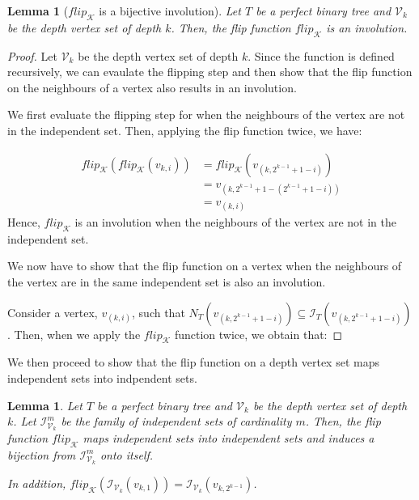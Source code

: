 \documentclass{amsart}
\newtheorem{lemma}[theorem]{Lemma}
\theoremstyle{definition}
\begin{document}
\begin{lemma}[$flip_\mathcal{K}$ is a bijective involution]\label{lemma_flip_bijective_involution}
  Let $T$ be a perfect binary tree and $\mathcal{V}_k$ be the depth vertex set of depth $k$. Then, the flip function $flip_\mathcal{K}$ is an involution.
\end{lemma}
\begin{proof}
  Let $\mathcal{V}_k$ be the depth vertex set of depth $k$. Since the function is defined recursively, we can evaulate the flipping step and then show that the flip function on the neighbours of a vertex also results in an involution.

  We first evaluate the flipping step for when the neighbours of the vertex are not in the independent set. Then, applying the flip function twice, we have:

  \begin{align*}
    flip_\mathcal{K}(flip_\mathcal{K}(v_{k, i})) & = flip_\mathcal{K}(v_{(k, 2^{k-1} + 1 - i)}) \\
                                                 & = v_{(k, 2^{k-1} + 1 - (2^{k-1} + 1 - i))}   \\
                                                 & = v_{(k, i)}
  \end{align*}
  Hence, $flip_\mathcal{K}$ is an involution when the neighbours of the vertex are not in the independent set.

  We now have to show that the flip function on a vertex when the neighbours of the vertex are in the same independent set is also an involution.

  Consider a vertex, $v_{(k, i)}$, such that $N_T(v_{(k, 2^{k-1} + 1 - i)}) \subseteq \mathcal{I}_T(v_{(k, 2^{k-1} + 1 - i)})$. Then, when we apply the $flip_\mathcal{K}$ function twice, we obtain that:

\end{proof}

We then proceed to show that the flip function on a depth vertex set maps independent sets into indpendent sets.

\begin{lemma}\label{lemma_flip_independent_sets}
  Let $T$ be a perfect binary tree and $\mathcal{V}_k$ be the depth vertex set of depth $k$. Let $\mathcal{I}^m_{\mathcal{V}_k}$ be the family of independent sets of cardinality $m$. Then, the flip function $flip_\mathcal{K}$ maps independent sets into independent sets and induces a bijection from $\mathcal{I}^m_{\mathcal{V}_k}$ onto itself.

  In addition, $flip_\mathcal{K}(\mathcal{I}_{\mathcal{V}_k}(v_{k, 1})) = \mathcal{I}_{\mathcal{V}_k}(v_{k, 2^{k-1}})$.
\end{lemma}
\end{document}
